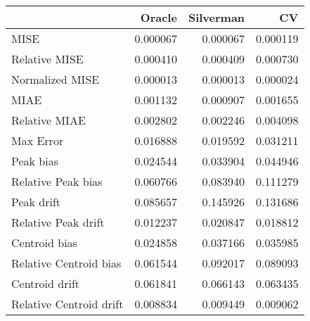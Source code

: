 \begin{tabular}{lrrr}
  \hline
 & Oracle & Silverman & CV \\ 
  \hline
MISE & 0.000067 & 0.000067 & 0.000119 \\ 
  Relative MISE & 0.000410 & 0.000409 & 0.000730 \\ 
  Normalized MISE & 0.000013 & 0.000013 & 0.000024 \\ 
  MIAE & 0.001132 & 0.000907 & 0.001655 \\ 
  Relative MIAE & 0.002802 & 0.002246 & 0.004098 \\ 
  Max Error & 0.016888 & 0.019592 & 0.031211 \\ 
  Peak bias & 0.024544 & 0.033904 & 0.044946 \\ 
  Relative Peak bias & 0.060766 & 0.083940 & 0.111279 \\ 
  Peak drift & 0.085657 & 0.145926 & 0.131686 \\ 
  Relative Peak drift & 0.012237 & 0.020847 & 0.018812 \\ 
  Centroid bias & 0.024858 & 0.037166 & 0.035985 \\ 
  Relative Centroid bias & 0.061544 & 0.092017 & 0.089093 \\ 
  Centroid drift & 0.061841 & 0.066143 & 0.063435 \\ 
  Relative Centroid drift & 0.008834 & 0.009449 & 0.009062 \\ 
   \hline
\end{tabular}
